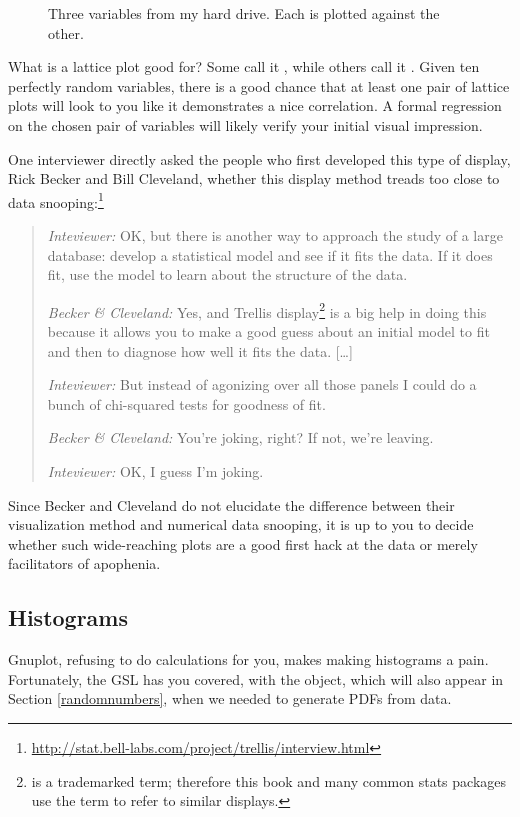 \begin{figure}
\caption{Three variables from my hard drive. Each is plotted against the
other.}\label{trellis}
\end{figure}

What is a lattice plot good for? Some call it , while others call it . Given ten perfectly
random variables, there is a good chance that at least one pair of
lattice plots will look to you like it demonstrates a nice correlation.
A formal regression on the chosen pair of variables will likely
verify your initial visual impression. 

One interviewer directly asked the people who first developed
this type of display, Rick Becker and Bill Cleveland,
whether this display method treads too close to data
snooping:\footnote{\url{http://stat.bell-labs.com/project/trellis/interview.html}}

\begin{quote}
{\em Inteviewer:} OK, but there is another way to approach the study of a large database:
develop a statistical model and see if it fits the data. If it does fit,
use the model to learn about the structure of the data.

{\em Becker \& Cleveland:} Yes, and Trellis
display\footnote{ is a trademarked term; therefore
this book and many common stats packages use the term 
to refer to similar displays.} is a big help in doing this because it
allows you to make a good guess about an initial model to fit and then
to diagnose how well it fits the data. [\dots]

{\em Inteviewer:} But instead of agonizing over all those panels I could do a bunch of
chi-squared tests for goodness of fit.

{\em Becker \& Cleveland:} You're joking, right? If not, we're leaving.

{\em Inteviewer:} OK, I guess I'm joking.
\end{quote}

Since Becker and Cleveland do not elucidate the difference between their
visualization method and numerical data snooping, it is up to you to
decide whether such wide-reaching plots are a good first hack at the
data or merely facilitators of apophenia.

\subsection{Histograms} 
Gnuplot, refusing to do calculations for you,
makes making histograms a pain.  Fortunately, the GSL has you covered,
with the  object, which will also appear
in Section \ref{randomnumbers}, when we needed to generate PDFs from data.

